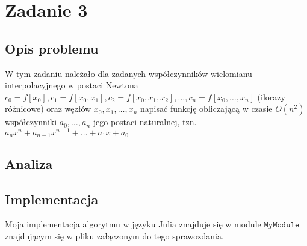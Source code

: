 \section{Zadanie 3}
\subsection{Opis problemu}
W tym zadaniu należało dla zadanych współczynników wielomianu interpolacyjnego w postaci Newtona $c_0 = f[x_0], c_1 = f[x_0, x_1], c_2 = f[x_0, x_1, x_2], \ldots, c_n = f[x_0, \ldots, x_n] $ (ilorazy różnicowe) oraz węzłów $x_0, x_1, \ldots, x_n$ napisać funkcję obliczającą w czasie $O(n^2)$ współczynniki $a_0, \ldots, a_n$ jego postaci naturalnej, tzn. $ a_nx^n + a_{n-1}x^{n-1} + \ldots + a_1x + a_0 $
\subsection{Analiza}
\subsection{Implementacja}
Moja implementacja algorytmu w języku Julia znajduje się w module $ \texttt{MyModule} $ znajdującym się w pliku załączonym do tego sprawozdania.